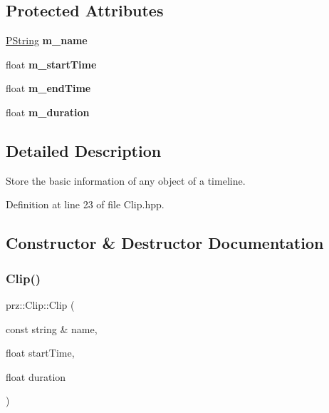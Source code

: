 \subsection*{Protected Attributes}
\begin{DoxyCompactItemize}
\item 
\mbox{\label{classprz_1_1_clip_a9480162480731a020244153ada1219aa}} 
\mbox{\hyperlink{classprz_1_1_p_string}{P\+String}} {\bfseries m\+\_\+name}
\item 
\mbox{\label{classprz_1_1_clip_ae9023bc80aedb38fcf1b9bc619a6f70c}} 
float {\bfseries m\+\_\+start\+Time}
\item 
\mbox{\label{classprz_1_1_clip_abca99f03f5bc3963ee2c813b33a52d8e}} 
float {\bfseries m\+\_\+end\+Time}
\item 
\mbox{\label{classprz_1_1_clip_abf582141d0a2385e1ec2e94cc9eca70b}} 
float {\bfseries m\+\_\+duration}
\end{DoxyCompactItemize}


\subsection{Detailed Description}
Store the basic information of any object of a timeline. 



Definition at line 23 of file Clip.\+hpp.



\subsection{Constructor \& Destructor Documentation}
\mbox{\label{classprz_1_1_clip_a8ca22ea87ef621e73273048b7f950918}} 
\subsubsection{\texorpdfstring{Clip()}{Clip()}\hspace{0.1cm}{\footnotesize\ttfamily [1/3]}}
{\footnotesize\ttfamily prz\+::\+Clip\+::\+Clip (\begin{DoxyParamCaption}\item[{const string \&}]{name,  }\item[{float}]{start\+Time,  }\item[{float}]{duration }\end{DoxyParamCaption})}



